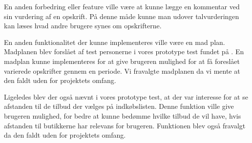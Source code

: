 En anden forbedring eller feature ville være at kunne lægge en kommentar ved sin vurdering af en opskrift.
På denne måde kunne man udover talvurderingen kan læses hvad andre brugere synes om opskrifterne. 

En anden funktionalitet der kunne implementeres ville være en mad plan.
Madplanen blev forslået af test personerne i vores prototype test fundet på \label{ch:protorespons}.
En madplan kunne implementeres for at give brugeren mulighed for at få foreslået varierede opskrifter gennem en periode.
Vi fravalgte madplanen da vi mente at den faldt uden for projektets omfang.

Ligeledes blev der også nævnt i vores prototype test, at der var interesse for at se afstanden til de tilbud der vælges på indkøbslisten.
Denne funktion ville give brugeren mulighed, for bedre at kunne bedømme hvilke tilbud de vil have, hvis afstanden til butikkerne har relevans for brugeren.
Funktionen blev også fravalgt da den faldt uden for projektets omfang.
